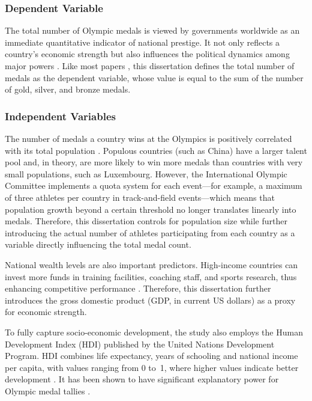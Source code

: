 \documentclass[11pt,twoside]{article}
\numberwithin{Theorem}{section}
\numberwithin{Definition}{section}
\numberwithin{Lemma}{section}
\numberwithin{Algorithm}{section}
\numberwithin{equation}{section}
\begin{document}
\subsubsection{Dependent Variable}
The total number of Olympic medals is viewed by governments worldwide as an immediate quantitative indicator of national prestige. It not only reflects a country's economic strength but also influences the political dynamics among major powers \cite{allison2002}. Like most papers \cite{andreff2008}\cite{schlembach2020}, this dissertation defines the total number of medals as the dependent variable, whose value is equal to the sum of the number of gold, silver, and bronze medals.

\subsubsection{Independent Variables}
The number of medals a country wins at the Olympics is positively correlated with its total population \cite{Bernard2004}.  Populous countries (such as China) have a larger talent pool and, in theory, are more likely to win more medals than countries with very small populations, such as Luxembourg.  However, the International Olympic Committee implements a quota system for each event---for example, a maximum of three athletes per country in track-and-field events---which means that population growth beyond a certain threshold no longer translates linearly into medals.  Therefore, this dissertation controls for population size while further introducing the actual number of athletes participating from each country as a variable directly influencing the total medal count.

National wealth levels are also important predictors.  High-income countries can invest more funds in training facilities, coaching staff, and sports research, thus enhancing competitive performance \cite{debosscher2008}.  Therefore, this dissertation further introduces the gross domestic product (GDP, in current US dollars) as a proxy for economic strength.

To fully capture socio-economic development, the study also employs the Human Development Index (HDI) published by the United Nations Development Program.   HDI combines life expectancy, years of schooling and national income per capita, with values ranging from 0 to~1, where higher values indicate better development \cite{sharma2015}.  It has been shown to have significant explanatory power for Olympic medal tallies \cite{Halsey2009}.
\end{document}
